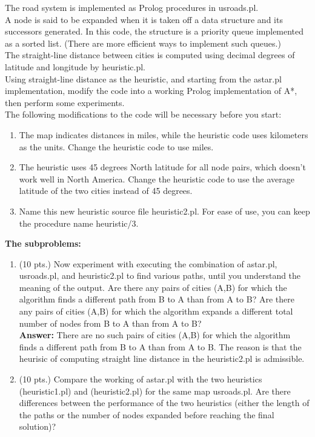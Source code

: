 \documentclass{article}%
\begin{document}
\begin{enumerate}
The road system is implemented as Prolog procedures in usroads.pl. \\
A node is said to be expanded when it is taken off a data structure and its successors generated. In this code, the structure is a priority queue implemented as a sorted list. (There are more efficient ways to implement such queues.) \\
The straight-line distance between cities is computed using decimal degrees of latitude and longitude by heuristic.pl. \\
Using straight-line distance as the heuristic, and starting from the astar.pl implementation, modify the code into a working Prolog implementation of A*, then perform some experiments. \\
The following modifications to the code will be necessary before you start: 
	\begin{enumerate}
  		\item The map indicates distances in miles, while the heuristic code uses kilometers as the units. Change the heuristic code to use miles.
  		\item The heuristic uses 45 degrees North latitude for all node pairs, which doesn't work well in North America. Change the heuristic code to use the average latitude of the two cities instead of 45 degrees.
  		\item Name this new heuristic source file heuristic2.pl. For ease of use, you can keep the procedure name heuristic/3.
	\end{enumerate}
	\textbf{The subproblems: }\\
	\begin{enumerate}
  		\item (10 pts.) Now experiment with executing the combination of astar.pl, usroads.pl, and heuristic2.pl to find various paths, until you understand the meaning of the output. Are there any pairs of cities (A,B) for which the algorithm finds a different path from B to A than from A to B? Are there any pairs of cities (A,B) for which the algorithm expands a different total number of nodes from B to A than from A to B? \\
  		
  		\textbf{Answer:} There are no such pairs of cities (A,B) for which the algorithm finds a different path from B to A than from A to B. The reason is that the heurisic of computing straight line distance in the heuristic2.pl is admissible. 
  		\item (10 pts.) Compare the working of astar.pl with the two heuristics (heuristic1.pl) and (heuristic2.pl) for the same map usroads.pl. Are there differences between the performance of the two heuristics (either the length of the paths or the number of nodes expanded before reaching the final solution)?\\
  		

\end{enumerate}
\end{enumerate}
\end{document}
